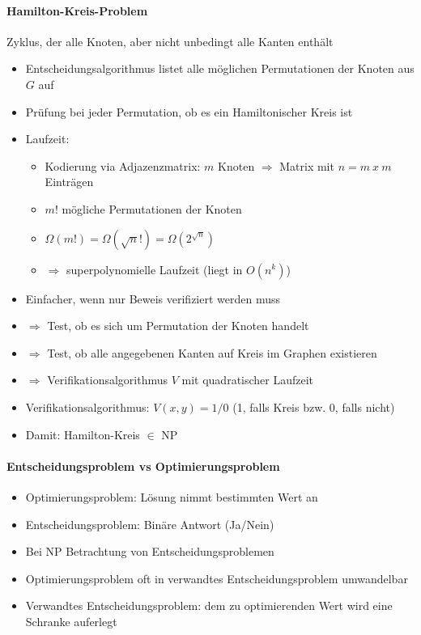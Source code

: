 \documentclass[
    ngerman,
    color=3b,
    dark_mode,
    load_common, %
    summary,
    boxarc,
]{tuda_summary}
\begin{document}
\paragraph{Hamilton-Kreis-Problem}\mbox{}
\begin{definition}\mbox{}
      Zyklus, der alle Knoten, aber nicht unbedingt alle Kanten enthält
\end{definition}
\begin{itemize}
      \item Entscheidungsalgorithmus listet alle möglichen Permutationen der Knoten aus $G$ auf
      \item Prüfung bei jeder Permutation, ob es ein Hamiltonischer Kreis ist
      \item Laufzeit:
            \begin{itemize}
                  \item Kodierung via Adjazenzmatrix: $m$ Knoten $\Rightarrow$ Matrix mit $n = m~x~m$ Einträgen
                  \item $m!$ mögliche Permutationen der Knoten
                  \item $\Omega(m!) = \Omega(\sqrt{n}!) = \Omega(2^{\sqrt{n}})$
                  \item $\Rightarrow$ superpolynomielle Laufzeit (liegt  in $O(n^k)$)
            \end{itemize}
      \item {} Einfacher, wenn nur Beweis verifiziert werden muss
      \item[] $\Rightarrow$ Test, ob es sich um Permutation der Knoten handelt
      \item[] $\Rightarrow$ Test, ob alle angegebenen Kanten auf Kreis im Graphen existieren
      \item[] $\Rightarrow$ Verifikationsalgorithmus $V$ mit quadratischer Laufzeit
      \item Verifikationsalgorithmus: $V(x,y) = 1/0$ (1, falls Kreis bzw. 0, falls nicht)
      \item Damit: Hamilton-Kreis $\in$ NP
\end{itemize}


\paragraph{Entscheidungsproblem vs Optimierungsproblem}
\begin{itemize}
      \item Optimierungsproblem: Lösung nimmt bestimmten Wert an
      \item Entscheidungsproblem: Binäre Antwort (Ja/Nein)
      \item Bei NP Betrachtung von Entscheidungsproblemen
      \item Optimierungsproblem oft in verwandtes Entscheidungsproblem umwandelbar
      \item Verwandtes Entscheidungsproblem: dem zu optimierenden Wert wird eine Schranke auferlegt
\end{itemize}
\end{document}
